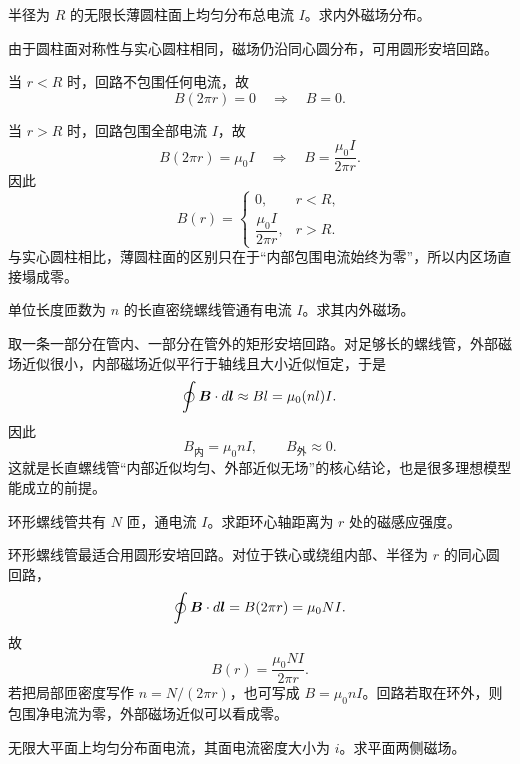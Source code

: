 \documentclass[lang=cn,11pt]{elegantbook}
\begin{document}
\begin{example}[无限长载流圆柱面的磁场]
半径为 \(R\) 的无限长薄圆柱面上均匀分布总电流 \(I\)。求内外磁场分布。
\end{example}

\begin{solution}
由于圆柱面对称性与实心圆柱相同，磁场仍沿同心圆分布，可用圆形安培回路。

当 \(r<R\) 时，回路不包围任何电流，故
\[
B(2\pi r)=0
\quad\Longrightarrow\quad
B=0.
\]

当 \(r>R\) 时，回路包围全部电流 \(I\)，故
\[
B(2\pi r)=\mu_0I
\quad\Longrightarrow\quad
B=\frac{\mu_0I}{2\pi r}.
\]
因此
\[
\boxed{
B(r)=
\begin{cases}
0, & r<R,\\[4pt]
\dfrac{\mu_0I}{2\pi r}, & r>R.
\end{cases}}
\]
与实心圆柱相比，薄圆柱面的区别只在于“内部包围电流始终为零”，所以内区场直接塌成零。
\end{solution}

\begin{example}[长直密绕螺线管的磁场]
单位长度匝数为 \(n\) 的长直密绕螺线管通有电流 \(I\)。求其内外磁场。
\end{example}

\begin{solution}
取一条一部分在管内、一部分在管外的矩形安培回路。对足够长的螺线管，外部磁场近似很小，内部磁场近似平行于轴线且大小近似恒定，于是
\[
\oint \vb*{B}\cdot d\vb*{l}\approx Bl=\mu_0(nl)I.
\]
因此
\[
\boxed{B_{\text{内}}=\mu_0nI},
\qquad
\boxed{B_{\text{外}}\approx 0}.
\]
这就是长直螺线管“内部近似均匀、外部近似无场”的核心结论，也是很多理想模型能成立的前提。
\end{solution}

\begin{example}[环形螺线管中的磁场]
环形螺线管共有 \(N\) 匝，通电流 \(I\)。求距环心轴距离为 \(r\) 处的磁感应强度。
\end{example}

\begin{solution}
环形螺线管最适合用圆形安培回路。对位于铁心或绕组内部、半径为 \(r\) 的同心圆回路，
\[
\oint \vb*{B}\cdot d\vb*{l}=B(2\pi r)=\mu_0NI.
\]
故
\[
\boxed{
B(r)=\frac{\mu_0NI}{2\pi r}
}.
\]
若把局部匝密度写作 \(n=N/(2\pi r)\)，也可写成 \(B=\mu_0nI\)。回路若取在环外，则包围净电流为零，外部磁场近似可以看成零。
\end{solution}

\begin{example}[无限大均匀平面电流的磁场]
无限大平面上均匀分布面电流，其面电流密度大小为 \(i\)。求平面两侧磁场。
\end{example}
\end{document}

